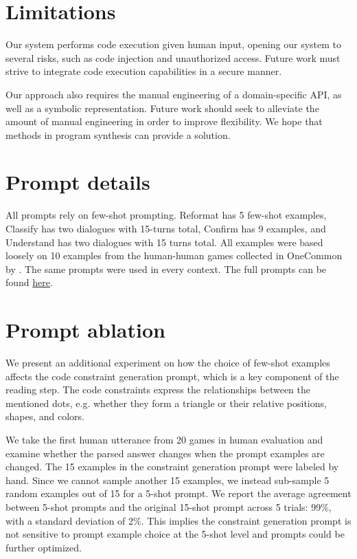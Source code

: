 \documentclass[11pt]{article}
\begin{document}
\section*{Limitations}
Our system performs code execution given human input,
opening our system to several risks, such as code injection and unauthorized access.
Future work must strive to integrate code execution capabilities in a secure manner.

Our approach also requires the manual engineering of a domain-specific API, as well as a symbolic representation. Future work should seek to alleviate the amount of manual engineering in order to improve flexibility. We hope that methods in program synthesis can provide a solution.




\appendix

\lstset{basicstyle=\footnotesize\ttfamily,breaklines=true}

\section{Prompt details}
All prompts rely on few-shot prompting. Reformat has 5 few-shot examples, Classify has two dialogues with 15-turns total, Confirm has 9 examples, and Understand has two dialogues with 15 turns total. All examples were based loosely on 10 examples from the human-human games collected in OneCommon by \citet{onecommon}. The same prompts were used in every context.
The full prompts can be found \href{https://github.com/justinchiu/onecommon-gpt}{here}.

\section{Prompt ablation}
We present an additional experiment on how the choice of few-shot examples affects the code constraint generation prompt, which is a key component of the reading step.
The code constraints express the relationships between the mentioned dots, e.g. whether they form a triangle or their relative positions, shapes, and colors.

We take the first human utterance from 20 games in human evaluation and examine whether the parsed answer changes when the prompt examples are changed. The 15 examples in the constraint generation prompt were labeled by hand. Since we cannot sample another 15 examples, we instead sub-sample 5 random examples out of 15 for a 5-shot prompt. We report the average agreement between 5-shot prompts and the original 15-shot prompt across 5 trials: 99\%, with a standard deviation of 2\%. This implies the constraint generation prompt is not sensitive to prompt example choice at the 5-shot level and prompts could be further optimized.
\end{document}
